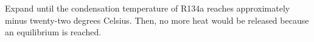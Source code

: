 Expand until the condensation temperature of R134a reaches approximately minus twenty-two degrees Celsius. Then, no more heat would be released because an equilibrium is reached.
